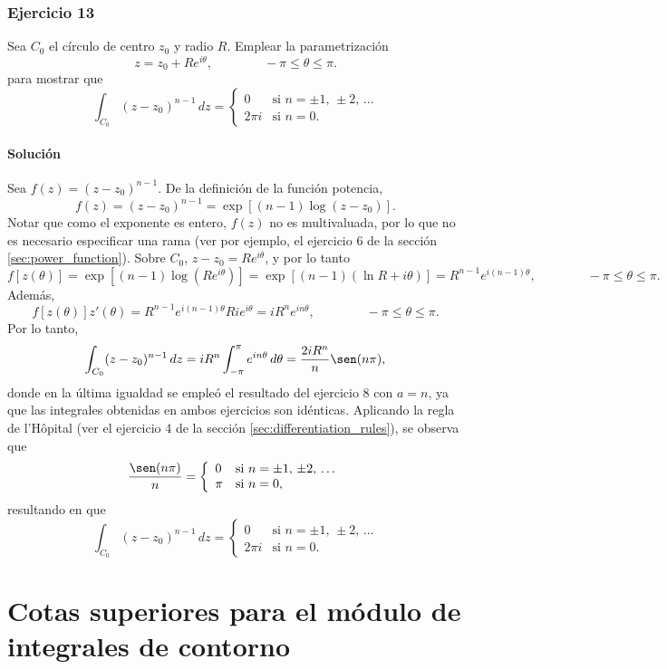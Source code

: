 \documentclass[a4paper]{report}
\begin{document}
\subsubsection{Ejercicio 13}

Sea \(C_0\) el círculo de centro \(z_0\) y radio \(R\). Emplear la parametrización 
\[
 z=z_0+Re^{i\theta},
 \qquad\qquad
 -\pi\leq\theta\leq\pi.
\]
para mostrar que 
\[
 \int_{C_0}(z-z_0)^{n-1}\,dz=
 \left\{ 
 \begin{array}{ll}
  0 &\textrm{si }n=\pm1,\,\pm2,\,\dots\\
  2\pi i&\textrm{si }n=0.
 \end{array}
 \right.
\]

\paragraph{Solución} Sea \(f(z)=(z-z_0)^{n-1}\). De la definición de la función potencia, 
\[
 f(z)=(z-z_0)^{n-1}=\exp\left[(n-1)\log(z-z_0)\right].
\]
Notar que como el exponente es entero, \(f(z)\) no es multivaluada, por lo que no es necesario especificar una rama (ver por ejemplo, el ejercicio 6 de la sección \ref{sec:power_function}). Sobre \(C_0\), \(z-z_0=Re^{i\theta}\), y por lo tanto
\[
 f[z(\theta)]=\exp\left[(n-1)\log(Re^{i\theta})\right]=\exp\left[(n-1)(\ln R+i\theta)\right]
  =R^{n-1}e^{i(n-1)\theta},
 \qquad\qquad
 -\pi\leq\theta\leq\pi. 
\]
Además,
\[
 f[z(\theta)]z'(\theta)=R^{n-1}e^{i(n-1)\theta}Rie^{i\theta}=iR^ne^{in\theta},
 \qquad\qquad
 -\pi\leq\theta\leq\pi. 
\]
Por lo tanto,
\[
 \int_{C_0}(z-z_0)^{n-1}\,dz=iR^n\int_{-\pi}^{\pi}e^{in\theta}\,d\theta=\frac{2iR^n}{n}\sen(n\pi),
\]
donde en la última igualdad se empleó el resultado del ejercicio 8 con \(a=n\), ya que las integrales obtenidas en ambos ejercicios son idénticas. Aplicando la regla de l'Hôpital (ver el ejercicio 4 de la sección \ref{sec:differentiation_rules}), se observa que 
\[
 \frac{\sen(n\pi)}{n}=
 \left\{ 
 \begin{array}{ll}
  0 &\textrm{si }n=\pm1,\,\pm2,\,\dots\\
  \pi&\textrm{si }n=0,
 \end{array}
 \right.
\]
resultando en que 
\[
 \int_{C_0}(z-z_0)^{n-1}\,dz=
 \left\{ 
 \begin{array}{ll}
  0 &\textrm{si }n=\pm1,\,\pm2,\,\dots\\
  2\pi i&\textrm{si }n=0.
 \end{array}
 \right.
\]

\section{Cotas superiores para el módulo de integrales de contorno}\label{sec:upper_bounds_for_moduli_of_contour_integrals}
\end{document}
